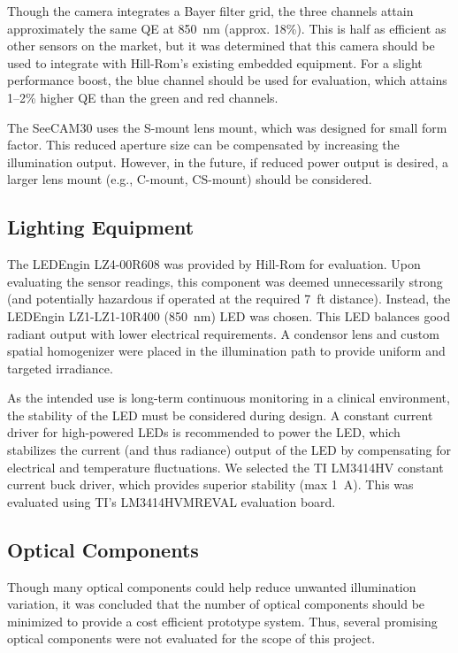 \documentclass{article}
\begin{document}
Though the camera integrates a Bayer filter grid, the three channels attain approximately the same QE at 850~nm (approx. 18\%). This is half as efficient as other sensors on the market, but it was determined that this camera should be used to integrate with Hill-Rom's existing embedded equipment. For a slight performance boost, the blue channel should be used for evaluation, which attains 1--2\% higher QE than the green and red channels.

The SeeCAM30 uses the S-mount lens mount, which was designed for small form factor. This reduced aperture size can be compensated by increasing the illumination output. However, in the future, if reduced power output is desired, a larger lens mount (e.g., C-mount, CS-mount) should be considered.

\subsection{Lighting Equipment}
The LEDEngin LZ4-00R608 was provided by Hill-Rom for evaluation. Upon evaluating the sensor readings, this component was deemed unnecessarily strong (and potentially hazardous if operated at the required 7~ft distance). Instead, the LEDEngin LZ1-LZ1-10R400 (850~nm) LED was chosen. This LED balances good radiant output with lower electrical requirements. A condensor lens and custom spatial homogenizer were placed in the illumination path to provide uniform and targeted irradiance.

As the intended use is long-term continuous monitoring in a clinical environment, the stability of the LED must be considered during design. A constant current driver for high-powered LEDs is recommended to power the LED, which stabilizes the current (and thus radiance) output of the LED by compensating for electrical and temperature fluctuations. We selected the TI LM3414HV constant current buck driver, which provides superior stability (max 1~A). This was evaluated using TI's LM3414HVMREVAL evaluation board.

\subsection{Optical Components}
Though many optical components could help reduce unwanted illumination variation, it was concluded that the number of optical components should be minimized to provide a cost efficient prototype system. Thus, several promising optical components were not evaluated for the scope of this project.
\end{document}
